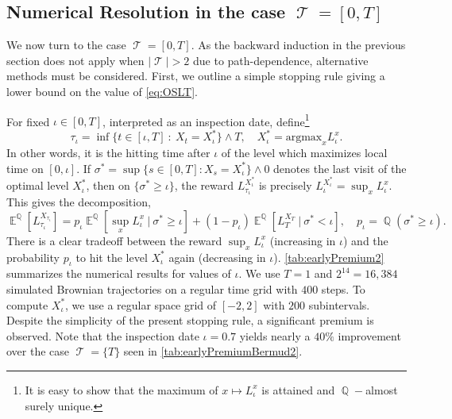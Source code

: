 \documentclass[11pt]{article}
\theoremstyle{plain}
\theoremstyle{definition}
\DeclareMathOperator{\E}{\mathbb{E}}
\DeclareMathOperator{\Q}{\mathbb{Q}}
\DeclareMathOperator{\calT}{\mathcal{T}}
\begin{document}
\subsection{Numerical Resolution in the case $\calT = [0,T]$} \label{sec:American}
We now turn to the case $\calT = [0,T]$. 
As the backward induction  in the previous section does not apply when $|\calT| > 2$ due to path-dependence, alternative methods  must be considered.    First, we outline a simple stopping rule giving a lower bound on the value of \eqref{eq:OSLT}. %

For fixed $\iota\in [0,T]$, interpreted as an inspection date, define\footnote{It is easy to show that the maximum of $x\mapsto L_\iota^x$ is attained and $\Q-$almost surely unique.}     $$\tau_\iota= \inf \{ t\in [\iota,T] \ : \ X_t = X^*_\iota\} \wedge T, \quad X^*_\iota = \text{argmax}_{x}L_\iota^x. $$
In other words, it is the hitting time after $\iota$ of the level which maximizes local time on $[0,\iota]$. 
If $\sigma^* = \sup \{s\in [0,T]  :  X_s = X^*_\iota \} \wedge 0$ denotes the last visit of the optimal level $X_\iota^*$,  then  on $\{\sigma^* \ge \iota\}$, the reward $L_{\tau_\iota}^{X_\iota^*}$ is precisely $L_{\iota}^{X_\iota^*} = \sup_x L_{\iota}^{x}$. 
This gives the decomposition, 
$$ \E^{\Q}[L_{\tau_\iota}^{X_{\tau_\iota}}] =   p_\iota\E^{\Q}[\sup_x L_{\iota}^{x}\ | \ \sigma^* \ge  \iota ] 
 + (1-p_{\iota})  \E^{\Q}[L_{T}^{X_{T}} \ | \ \sigma^* < \iota], \quad p_\iota = \Q(\sigma^* \ge \iota).$$
 There is a clear tradeoff between the reward $\sup_x L_{\iota}^{x}$ (increasing in $\iota$) and the probability $p_\iota$ to hit the  level $X^*_\iota$ again  (decreasing in $\iota$).
\cref{tab:earlyPremium2} summarizes the numerical results for values of  $\iota$. We use $T=1$ and  $2^{14} = 16,384$ simulated Brownian trajectories on a regular time grid with $400$  steps. To compute $X_{\iota}^*$, we use a regular space grid  of $[-2,2]$ with  $200$ subintervals. Despite the simplicity of the present stopping rule,  a  significant premium is observed. 
Note that the inspection date $\iota =0.7$ yields nearly a $40\%$ improvement over the case $\calT = \{T\}$  seen in \cref{tab:earlyPremiumBermud2}.  %
\end{document}

